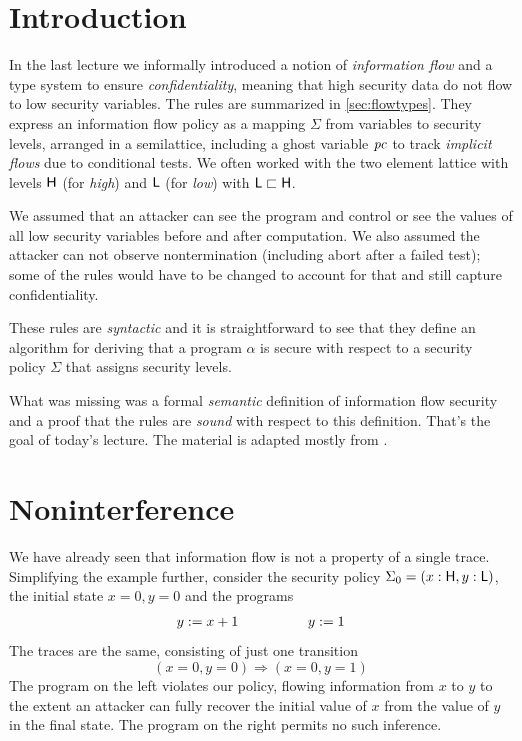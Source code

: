 \documentclass[11pt]{article}
\begin{document}
\maketitle

\section{Introduction}

In the last lecture we informally introduced a notion of \emph{information flow}
and a type system to ensure \emph{confidentiality}, meaning that high security
data do not flow to low security variables.  The rules are summarized in
\autoref{sec:flowtypes}.  They express an information flow policy as a mapping
$\Sigma$ from variables to security levels, arranged in a semilattice, including
a ghost variable $\mathit{pc}$ to track \emph{implicit flows} due to conditional
tests.  We often worked with the two element lattice with levels $\mathsf{H}$ (for
\emph{high}) and $\mathsf{L}$ (for \emph{low}) with $\mathsf{L} \sqsubset \mathsf{H}$.

We assumed that an attacker can see the program and control or see the values of
all low security variables before and after computation.  We also assumed the
attacker can not observe nontermination (including abort after a failed test);
some of the rules would have to be changed to account for that and still capture
confidentiality.

These rules are \emph{syntactic} and it is straightforward to see that they
define an algorithm for deriving that a program $\alpha$ is secure with respect
to a security policy $\Sigma$ that assigns security levels.

What was missing was a formal \emph{semantic} definition of information flow
security and a proof that the rules are \emph{sound} with respect to this
definition.  That's the goal of today's lecture.  The material is adapted mostly
from \citet{Volpano96jcs}.

\section{Noninterference}

We have already seen that information flow is not a property of a single trace.
Simplifying the example further, consider the security policy
$\Sigma_0 = (x : \mathsf{H}, y : \mathsf{L})$, the initial state $x = 0, y = 0$
and the programs
\[
  \begin{array}{c@{\hspace{5em}}c}
    y := x + 1 & y := 1
  \end{array}
\]
The traces are the same, consisting of just one transition
\[
  (x = 0, y = 0) \Rightarrow (x = 0, y = 1)
\]
The program on the left violates our policy, flowing information from $x$ to $y$
to the extent an attacker can fully recover the initial value of $x$ from the
value of $y$ in the final state.  The program on the right permits no such
inference.
\end{document}
